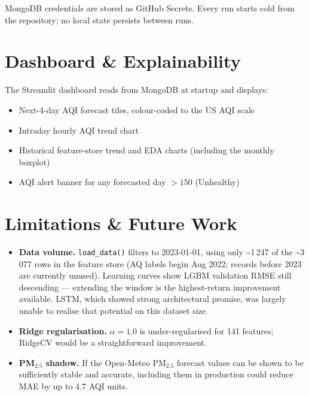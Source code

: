 \documentclass[11pt,a4paper]{article}
\begin{document}
MongoDB credentials are stored as GitHub Secrets. Every run starts cold from the
repository; no local state persists between runs.

\section{Dashboard \& Explainability}

The Streamlit dashboard reads from MongoDB at startup and displays:

\begin{itemize}[noitemsep,topsep=0pt]
  \item Next-4-day AQI forecast tiles, colour-coded to the US AQI scale
  \item Intraday hourly AQI trend chart
  \item Historical feature-store trend and EDA charts (including the monthly boxplot)
  \item AQI alert banner for any forecasted day $>150$ (Unhealthy)
\end{itemize}

\section{Limitations \& Future Work}

\begin{itemize}[noitemsep,topsep=0pt]
  \item \textbf{Data volume.}\; \texttt{load\_data()} filters to 2023-01-01,
        using only \textasciitilde1\,247 of the \textasciitilde3\,077 rows in
        the feature store (AQ labels begin Aug 2022; records before 2023 are
        currently unused).  Learning curves show LGBM validation RMSE still
        descending — extending the window is the highest-return improvement
        available.  LSTM, which showed strong architectural promise, was largely
        unable to realise that potential on this dataset size.
  \item \textbf{Ridge regularisation.}\; $\alpha=1.0$ is under-regularised for 141
        features; RidgeCV would be a straightforward improvement.
  \item \textbf{PM$_{2.5}$ shadow.}\; If the Open-Meteo PM$_{2.5}$ forecast values
        can be shown to be sufficiently stable and accurate, including them in
        production could reduce MAE by up to 4.7 AQI units.
\end{itemize}
\end{document}
